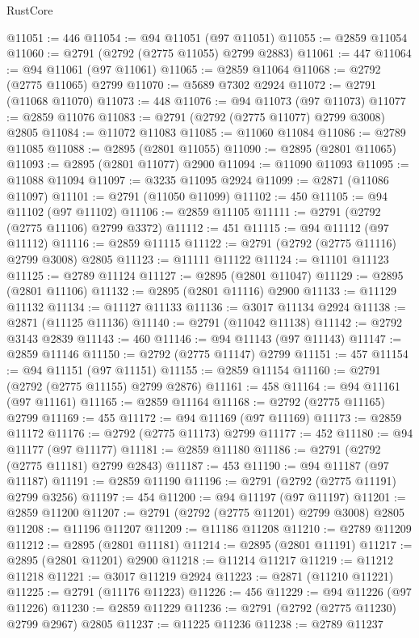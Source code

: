 \begin{lexlean}{RustCore}
\begin{coremodule}
@11051 := 446
@11054 := @94 @11051 (@97 @11051)
@11055 := @2859 @11054
@11060 := @2791 (@2792 (@2775 @11055) @2799 @2883)
@11061 := 447
@11064 := @94 @11061 (@97 @11061)
@11065 := @2859 @11064
@11068 := @2792 (@2775 @11065) @2799
@11070 := @5689 @7302 @2924
@11072 := @2791 (@11068 @11070)
@11073 := 448
@11076 := @94 @11073 (@97 @11073)
@11077 := @2859 @11076
@11083 := @2791 (@2792 (@2775 @11077) @2799 @3008) @2805
@11084 := @11072 @11083
@11085 := @11060 @11084
@11086 := @2789 @11085
@11088 := @2895 (@2801 @11055)
@11090 := @2895 (@2801 @11065)
@11093 := @2895 (@2801 @11077) @2900
@11094 := @11090 @11093
@11095 := @11088 @11094
@11097 := @3235 @11095 @2924
@11099 := @2871 (@11086 @11097)
@11101 := @2791 (@11050 @11099)
@11102 := 450
@11105 := @94 @11102 (@97 @11102)
@11106 := @2859 @11105
@11111 := @2791 (@2792 (@2775 @11106) @2799 @3372)
@11112 := 451
@11115 := @94 @11112 (@97 @11112)
@11116 := @2859 @11115
@11122 := @2791 (@2792 (@2775 @11116) @2799 @3008) @2805
@11123 := @11111 @11122
@11124 := @11101 @11123
@11125 := @2789 @11124
@11127 := @2895 (@2801 @11047)
@11129 := @2895 (@2801 @11106)
@11132 := @2895 (@2801 @11116) @2900
@11133 := @11129 @11132
@11134 := @11127 @11133
@11136 := @3017 @11134 @2924
@11138 := @2871 (@11125 @11136)
@11140 := @2791 (@11042 @11138)
@11142 := @2792 @3143 @2839
@11143 := 460
@11146 := @94 @11143 (@97 @11143)
@11147 := @2859 @11146
@11150 := @2792 (@2775 @11147) @2799
@11151 := 457
@11154 := @94 @11151 (@97 @11151)
@11155 := @2859 @11154
@11160 := @2791 (@2792 (@2775 @11155) @2799 @2876)
@11161 := 458
@11164 := @94 @11161 (@97 @11161)
@11165 := @2859 @11164
@11168 := @2792 (@2775 @11165) @2799
@11169 := 455
@11172 := @94 @11169 (@97 @11169)
@11173 := @2859 @11172
@11176 := @2792 (@2775 @11173) @2799
@11177 := 452
@11180 := @94 @11177 (@97 @11177)
@11181 := @2859 @11180
@11186 := @2791 (@2792 (@2775 @11181) @2799 @2843)
@11187 := 453
@11190 := @94 @11187 (@97 @11187)
@11191 := @2859 @11190
@11196 := @2791 (@2792 (@2775 @11191) @2799 @3256)
@11197 := 454
@11200 := @94 @11197 (@97 @11197)
@11201 := @2859 @11200
@11207 := @2791 (@2792 (@2775 @11201) @2799 @3008) @2805
@11208 := @11196 @11207
@11209 := @11186 @11208
@11210 := @2789 @11209
@11212 := @2895 (@2801 @11181)
@11214 := @2895 (@2801 @11191)
@11217 := @2895 (@2801 @11201) @2900
@11218 := @11214 @11217
@11219 := @11212 @11218
@11221 := @3017 @11219 @2924
@11223 := @2871 (@11210 @11221)
@11225 := @2791 (@11176 @11223)
@11226 := 456
@11229 := @94 @11226 (@97 @11226)
@11230 := @2859 @11229
@11236 := @2791 (@2792 (@2775 @11230) @2799 @2967) @2805
@11237 := @11225 @11236
@11238 := @2789 @11237

\end{coremodule}
\end{lexlean}
